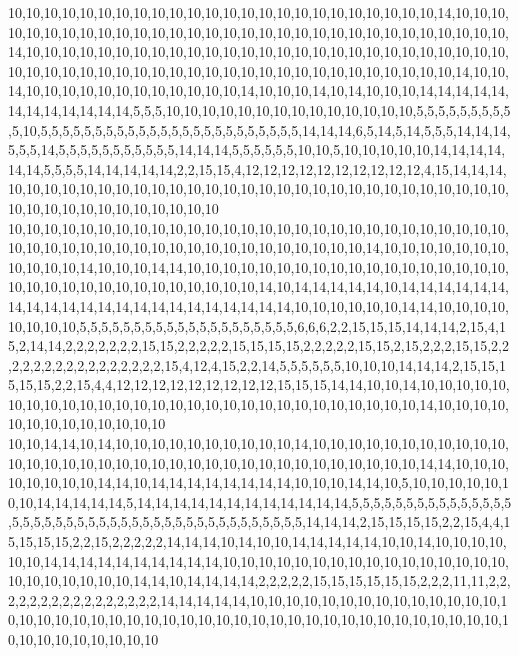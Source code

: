 10,10,10,10,10,10,10,10,10,10,10,10,10,10,10,10,10,10,10,10,10,10,10,10,14,10,10,10,10,10,10,10,10,10,10,10,10,10,10,10,10,10,10,10,10,10,10,10,10,10,10,10,10,10,10,10,14,10,10,10,10,10,10,10,10,10,10,10,10,10,10,10,10,10,10,10,10,10,10,10,10,10,10,10,10,10,10,10,10,10,10,10,10,10,10,10,10,10,10,10,10,10,10,10,10,10,10,10,10,14,10,10,14,10,10,10,10,10,10,10,10,10,10,10,10,14,10,10,10,14,10,14,10,10,10,14,14,14,14,14,14,14,14,14,14,14,14,5,5,5,10,10,10,10,10,10,10,10,10,10,10,10,10,10,5,5,5,5,5,5,5,5,5,5,10,5,5,5,5,5,5,5,5,5,5,5,5,5,5,5,5,5,5,5,5,5,5,5,5,14,14,14,6,5,14,5,14,5,5,5,14,14,14,5,5,5,14,5,5,5,5,5,5,5,5,5,5,5,14,14,14,5,5,5,5,5,5,10,10,5,10,10,10,10,10,14,14,14,14,14,14,5,5,5,5,14,14,14,14,14,2,2,15,15,4,12,12,12,12,12,12,12,12,12,12,4,15,14,14,14,10,10,10,10,10,10,10,10,10,10,10,10,10,10,10,10,10,10,10,10,10,10,10,10,10,10,10,10,10,10,10,10,10,10,10,10,10,10,10,10
10,10,10,10,10,10,10,10,10,10,10,10,10,10,10,10,10,10,10,10,10,10,10,10,10,10,10,10,10,10,10,10,10,10,10,10,10,10,10,10,10,10,10,10,10,10,10,10,14,10,10,10,10,10,10,10,10,10,10,10,14,10,10,10,14,14,10,10,10,10,10,10,10,10,10,10,10,10,10,10,10,10,10,10,10,10,10,10,10,10,10,10,10,10,10,10,10,10,14,10,14,14,14,14,14,10,14,14,14,14,14,14,14,14,14,14,14,14,14,14,14,14,14,14,14,14,14,14,10,10,10,10,10,10,14,14,10,10,10,10,10,10,10,10,5,5,5,5,5,5,5,5,5,5,5,5,5,5,5,5,5,5,5,5,6,6,6,2,2,15,15,15,14,14,14,2,15,4,15,2,14,14,2,2,2,2,2,2,2,15,15,2,2,2,2,2,15,15,15,15,2,2,2,2,2,15,15,2,15,2,2,2,15,15,2,2,2,2,2,2,2,2,2,2,2,2,2,2,2,2,15,4,12,4,15,2,2,14,5,5,5,5,5,5,10,10,10,14,14,14,2,15,15,15,15,15,2,2,15,4,4,12,12,12,12,12,12,12,12,12,15,15,15,14,14,10,10,14,10,10,10,10,10,10,10,10,10,10,10,10,10,10,10,10,10,10,10,10,10,10,10,10,10,10,10,10,14,10,10,10,10,10,10,10,10,10,10,10,10,10
10,10,14,14,10,14,10,10,10,10,10,10,10,10,10,10,14,10,10,10,10,10,10,10,10,10,10,10,10,10,10,10,10,10,10,10,10,10,10,10,10,10,10,10,10,10,10,10,10,10,10,14,14,10,10,10,10,10,10,10,10,14,14,10,14,14,14,14,14,14,14,14,10,10,10,14,14,10,5,10,10,10,10,10,10,10,14,14,14,14,14,5,14,14,14,14,14,14,14,14,14,14,14,14,5,5,5,5,5,5,5,5,5,5,5,5,5,5,5,5,5,5,5,5,5,5,5,5,5,5,5,5,5,5,5,5,5,5,5,5,5,5,5,5,5,5,14,14,14,2,15,15,15,15,2,2,15,4,4,15,15,15,15,2,2,15,2,2,2,2,2,14,14,14,10,14,10,10,14,14,14,14,14,10,10,14,10,10,10,10,10,10,14,14,14,14,14,14,14,14,14,14,10,10,10,10,10,10,10,10,10,10,10,10,10,10,10,10,10,10,10,10,10,10,10,14,14,10,14,14,14,14,2,2,2,2,2,15,15,15,15,15,15,2,2,2,11,11,2,2,2,2,2,2,2,2,2,2,2,2,2,2,2,2,14,14,14,14,14,10,10,10,10,10,10,10,10,10,10,10,10,10,10,10,10,10,10,10,10,10,10,10,10,10,10,10,10,10,10,10,10,10,10,10,10,10,10,10,10,10,10,10,10,10,10,10,10,10,10,10
